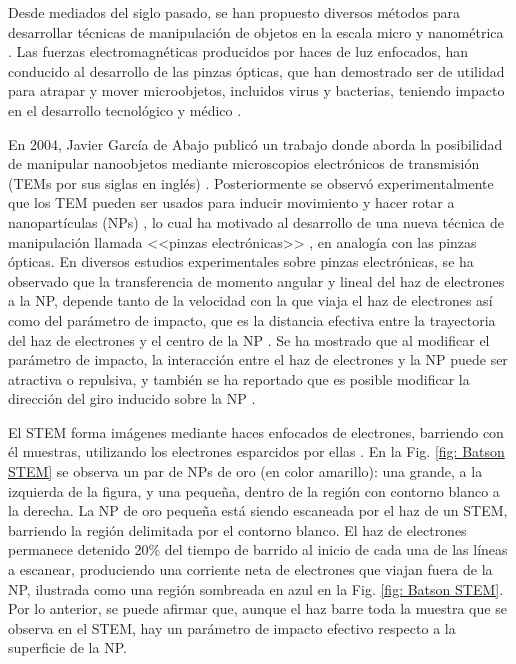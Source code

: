
Desde mediados del siglo pasado, se han propuesto diversos métodos para desarrollar técnicas de manipulación de objetos en la escala micro y nanométrica \cite{ashkin1970acceleration, ashkin1987optical, Ashkin, custance2009atomic, dholakia2011shaping, marago2013optical, romo2020controlled}. Las fuerzas electromagnéticas producidos por haces de luz enfocados, han conducido al desarrollo de las pinzas ópticas, que han demostrado ser de utilidad para atrapar y mover microobjetos, incluidos virus y bacterias, teniendo impacto en el desarrollo tecnológico y médico \cite{ashkin1970acceleration, ashkin1987optical, Ashkin}.  

En 2004, Javier García de Abajo publicó un trabajo donde aborda la posibilidad de manipular nanoobjetos mediante microscopios electrónicos de transmisión (TEMs por sus siglas en inglés) \cite{GarciadeAbajo0}. Posteriormente se observó experimentalmente que los TEM pueden ser usados para inducir movimiento y hacer rotar a nanopartículas (NPs) \cite{Batson01, zheng2012electron}, lo cual ha motivado al desarrollo de una nueva técnica de manipulación llamada <<pinzas electrónicas>> \cite{Batson, oleshko2005electron, Oleshko}, en analogía con las pinzas ópticas. En diversos estudios experimentales sobre pinzas electrónicas, se ha observado que la transferencia de momento angular y lineal del haz de electrones a la NP, depende tanto de la velocidad con la que viaja el haz de electrones así como del parámetro de impacto, que es la distancia efectiva entre la trayectoria del haz de electrones y el centro de la NP \cite{OLESHKO2013203, Oleshko, Batson, Batson01, zheng2012electron, xu2010transmission}.  Se ha mostrado que al modificar el parámetro de impacto, la interacción entre el haz de electrones y la NP puede ser atractiva o repulsiva, y también se ha reportado que es posible modificar la dirección del giro inducido sobre la NP \cite{OLESHKO2013203, Batson, Oleshko}. 

El STEM forma imágenes mediante haces enfocados de electrones, barriendo con él muestras, utilizando los electrones esparcidos por ellas \cite{Batson}. En la Fig. \ref{fig: Batson STEM} se observa un par de NPs de oro (en color amarillo): una grande, a la izquierda de la figura, y una pequeña, dentro de la región con contorno blanco a la derecha. La NP de oro pequeña está siendo escaneada por el haz de un STEM, barriendo la región delimitada por el contorno blanco. El haz de electrones permanece detenido 20\% del tiempo de barrido al inicio de cada una de las líneas a escanear, produciendo una corriente neta de electrones que viajan fuera de la NP, ilustrada como una región sombreada en azul en la Fig. \ref{fig: Batson STEM}. Por lo anterior, se puede afirmar que, aunque el haz barre toda la muestra que se observa en el STEM, hay un parámetro de impacto efectivo respecto a la superficie de la NP.

